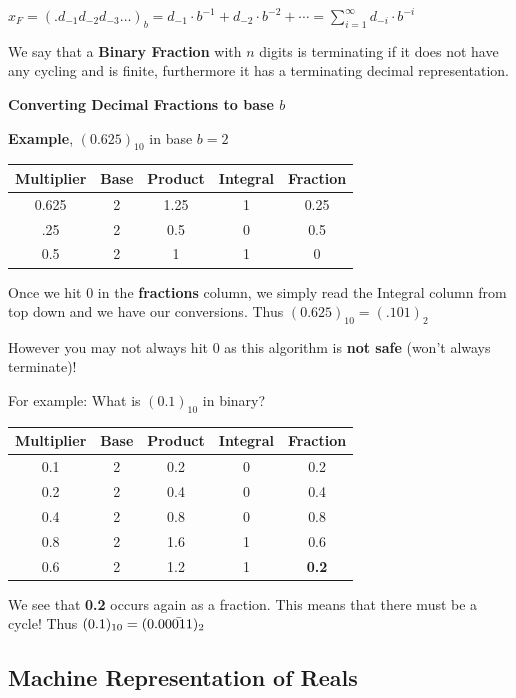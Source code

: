 \documentclass{article}
\begin{document}
$x_F = (.d_{-1}d_{-2}d_{-3} \dots)_b = d_{-1} \cdot b^{-1} + d_{-2} \cdot b^{-2} + \cdots = \displaystyle \sum_{i = 1}^\infty d_{-i} \cdot b^{-i}$

We say that a \textbf{Binary Fraction} with $n$ digits is terminating if it does not have any cycling and is finite, furthermore it has a terminating decimal representation.

\pagebreak

\text{}

\textbf{Converting Decimal Fractions to base $b$}

\textbf{Example}, $(0.625)_{10}$ in base $b = 2$

\begin{center}
    \begin{tabular}{c|c|c|c|c}
    Multiplier &  Base & Product & Integral & Fraction\\
    \hline
    0.625 & 2 & 1.25 & 1 & 0.25\\
    .25 & 2 & 0.5 & 0 & 0.5\\
    0.5 & 2 & 1 & 1 & 0\\
    \end{tabular}
\end{center}

Once we hit 0 in the \textbf{fractions} column, we simply read the Integral column from top down and we have our conversions. Thus $(0.625)_{10} = (.101)_{2}$ 

However you may not always hit 0 as this algorithm is \textbf{not safe} (won't always terminate)!

For example: What is $(0.1)_{10}$ in binary?

\begin{center}
    \begin{tabular}{c|c|c|c|c}
    Multiplier & Base & Product & Integral & Fraction\\
    \hline
    0.1 & 2 & 0.2 & 0 & 0.2\\
    0.2 & 2 & 0.4 & 0 & 0.4\\
    0.4 & 2 & 0.8 & 0 & 0.8\\
    0.8 & 2 & 1.6 & 1 & 0.6\\
    0.6 & 2 & 1.2 & 1 & \textbf{0.2}
    \end{tabular}
\end{center}

We see that \textbf{0.2} occurs again as a fraction. This means that there must be a cycle! Thus $(0.1)_{10} = (0.0\Bar{0011})_{2}$

\subsection{Machine Representation of Reals}
\end{document}
